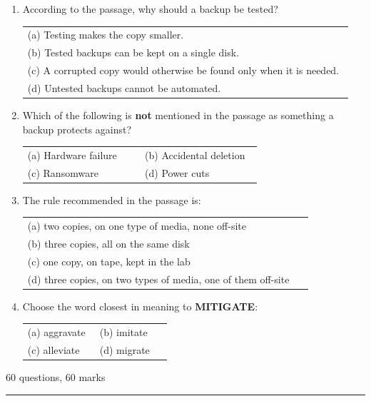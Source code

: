 \documentclass[11pt,a4paper]{article}
\makeatletter
\newcommand{\opts}[4]{\par\nopagebreak\vspace{2pt}%
\begin{tabular}{@{}p{0.47\linewidth}p{0.47\linewidth}@{}}
(a) #1 & (b) #2\\ (c) #3 & (d) #4\end{tabular}}
\newcommand{\optl}[4]{\par\nopagebreak\vspace{2pt}%
\begin{tabular}{@{}p{0.95\linewidth}@{}}
(a) #1\\ (b) #2\\ (c) #3\\ (d) #4\end{tabular}}
\newcommand{\sect}[2]{\vspace{8pt}{\large\bfseries\color{ember}#1}\hfill{\small\color{slate}#2}\par
{\color{slate}\hrule}\vspace{6pt}}
\makeatother
\begin{document}
\begin{enumerate}[resume]
\item According to the passage, why should a backup be tested?
\optl{Testing makes the copy smaller.}{Tested backups can be kept on a single disk.}{A corrupted copy would otherwise be found only when it is needed.}{Untested backups cannot be automated.}
\item Which of the following is \textbf{not} mentioned in the passage as something a backup protects against?
\opts{Hardware failure}{Accidental deletion}{Ransomware}{Power cuts}
\item The rule recommended in the passage is:
\optl{two copies, on one type of media, none off-site}{three copies, all on the same disk}{one copy, on tape, kept in the lab}{three copies, on two types of media, one of them off-site}
\item Choose the word closest in meaning to \textbf{MITIGATE}:
\opts{aggravate}{imitate}{alleviate}{migrate}
\end{enumerate}
\sect{Part B: CSE Domain}{60 questions, 60 marks}
\end{document}
